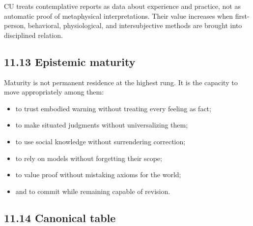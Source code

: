 \documentclass[
  11pt,
]{article}
\providecommand{\tightlist}{%
  \setlength{\itemsep}{0pt}\setlength{\parskip}{0pt}}
\begin{document}
CU treats contemplative reports as data about experience and practice,
not as automatic proof of metaphysical interpretations. Their value
increases when first-person, behavioral, physiological, and
intersubjective methods are brought into disciplined relation.

\subsection{11.13 Epistemic maturity}\label{epistemic-maturity}

Maturity is not permanent residence at the highest rung. It is the
capacity to move appropriately among them:

\begin{itemize}
\tightlist
\item
  to trust embodied warning without treating every feeling as fact;
\item
  to make situated judgments without universalizing them;
\item
  to use social knowledge without surrendering correction;
\item
  to rely on models without forgetting their scope;
\item
  to value proof without mistaking axioms for the world;
\item
  and to commit while remaining capable of revision.
\end{itemize}

\subsection{11.14 Canonical table}\label{canonical-table}
\end{document}
